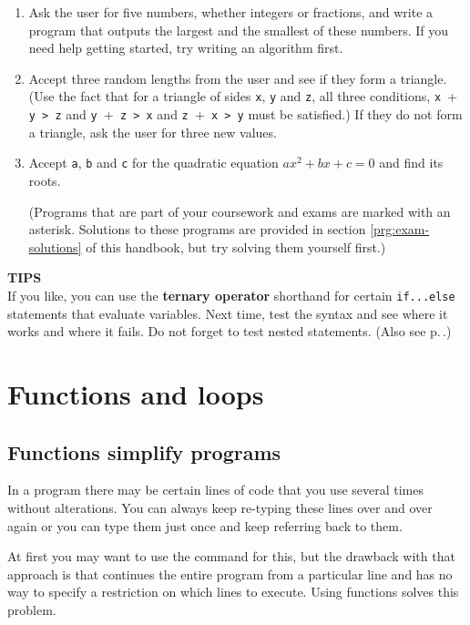 \documentclass[11pt,oneside]{article}
\newcommand{\eb}[1]{\textbf{\scriptsize{\sffamily\addfontfeatures{LetterSpace=7} #1\\[.35em]}}}
\begin{document}
{{{{{{{{{\begin{enumerate}[label=\arabic*.]
Write a C program based on this algorithm.
\label{ex:euclid-algorithm}
\item Ask the user for five numbers, whether integers or fractions, and write a program that outputs the largest and the smallest of these numbers. If you need help getting started, try writing an algorithm first.
\item Accept three random lengths from the user and see if they form a triangle. (Use the fact that for a triangle of sides \verb+x+, \verb+y+ and \verb+z+, all three conditions, \verb+x ++\verb+ y > z+ and \verb+y ++\verb+ z > x+ and \verb+z ++\verb+ x > y+ must be satisfied.) If they do not form a triangle, ask the user for three new values.

\item[\bfseries*\stepcounter{enumi}\theenumi] Accept \verb+a+, \verb+b+ and \verb+c+ for the quadratic equation $ax^2+bx+c=0$ and find its roots.

(Programs that are part of your coursework and exams are marked with an asterisk. Solutions to these programs are provided in section \ref{prg:exam-solutions} of this handbook, but try solving them yourself first.)
\end{enumerate}

\begin{errorbox}
\eb{TIPS }
If you like, you can use the \textbf{ternary operator} shorthand for certain \verb+if...else+ statements that evaluate variables. Next time, test the syntax  and see where it works and where it fails. Do not forget to test nested statements. (Also see p.\,\pageref{sec:switching-things-around}.)
\end{errorbox}

\section{Functions and loops}
\subsection{Functions simplify programs}

In a program there may be certain lines of code that you use several times without alterations. You can always keep re-typing these lines over and over again or you can type them just once and keep referring back to them.

At first you may want to use the  command for this, but the drawback with that approach is that  continues the entire program from a particular line and has no way to specify a restriction on which lines to execute. Using functions solves this problem.

}}}}}}}}}
\end{document}
